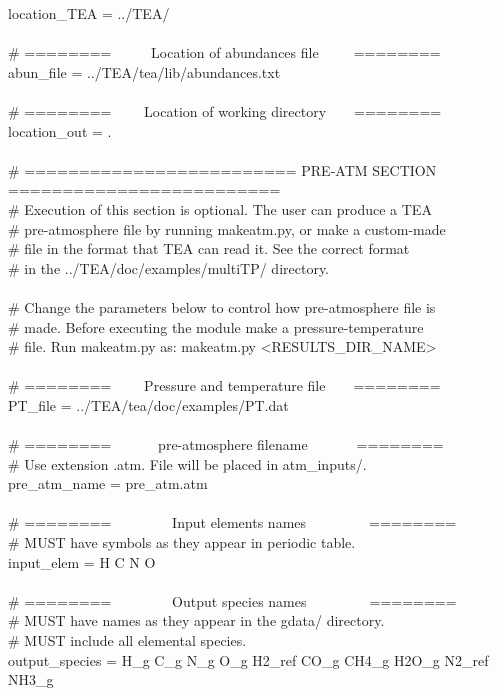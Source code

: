 {{  location\_TEA = ../TEA/\\ \\ \# ======== ~~~~~Location of abundances
  file~~~~~========\\ abun\_file =
  ../TEA/tea/lib/abundances.txt\\ \\ \# ======== ~~~~Location of
  working directory~~~~========\\ location\_out = .\\ \\ \#
  ========================= PRE-ATM SECTION
  ========================= \\ \# Execution of this section is
  optional. The user can produce a TEA\\ \# pre-atmosphere file by
  running makeatm.py, or make a custom-made \\ \# file in the format
  that TEA can read it. See the correct format \\ \# in the
  ../TEA/doc/examples/multiTP/ directory.\\ \\ \# Change the parameters
  below to control how pre-atmosphere file is \\ \# made. Before
  executing the module make a pressure-temperature \\ \# file. Run
  makeatm.py as: makeatm.py <RESULTS\_DIR\_NAME>\\ \\ \# ========
  ~~~~Pressure and temperature file~~~~========\\ PT\_file =
  ../TEA/tea/doc/examples/PT.dat\\ \\ \# ======== ~~~~~~pre-atmosphere
  filename~~~~~~~========\\ \# Use extension .atm. File will be placed
  in atm\_inputs/.\\ pre\_atm\_name = pre\_atm.atm\\ \\ \# ========
  ~~~~~~~~Input elements names~~~~~~~~~========\\ \# MUST have symbols
  as they appear in periodic table. \\ input\_elem = H C N O\\ \\ \#
  ======== ~~~~~~~~Output species names~~~~~~~~~========\\ \# MUST
  have names as they appear in the gdata/ directory. \\ \# MUST include all
  elemental species. \\ output\_species = H\_g C\_g N\_g O\_g H2\_ref
  CO\_g CH4\_g H2O\_g N2\_ref NH3\_g \\ }
\normalsize

}
